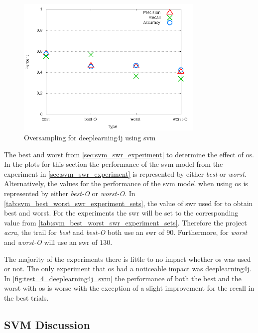\begin{figure}[!ht]
    \centering
        \includegraphics[width=0.8\textwidth]{images/svm/test_4/deeplearning4j_sample_range}
    \caption{Oversampling for deeplearning4j using \gls{svm}}
    \label{fig:test_4_deeplearning4j_svm}
\end{figure}

The best and worst from \autoref{sec:svm_swr_experiment} to determine the effect of \gls{os}. In the plots for this section the performance of the \gls{svm} model from the experiment in \autoref{sec:svm_swr_experiment} is represented by either \textit{best} or \textit{worst}. Alternatively, the values for the performance of the \gls{svm} model when using \gls{os} is represented by either \textit{best-O} or \textit{worst-O}. In \autoref{tab:svm_best_worst_swr_experiment_sets}, the value of \gls{swr} used for to obtain best and worst. For the experiments the \gls{swr} will be set to the corresponding value from \autoref{tab:svm_best_worst_swr_experiment_sets}. Therefore the project \textit{acra}, the trail for \textit{best} and \textit{best-O} both use an \gls{swr} of $90$. Furthermore, for \textit{worst} and \textit{worst-O} will use an \gls{swr} of $130$.

The majority of the experiments there is little to no impact whether \gls{os} was used or not. The only experiment that \gls{os} had a noticeable impact was deeplearning4j. In \autoref{fig:test_4_deeplearning4j_svm} the performance of both the best and the worst with \gls{os} is worse with the exception of a slight improvement for the recall in the best trials.

\subsection{SVM Discussion}
\label{subsec:svm_discussion}


